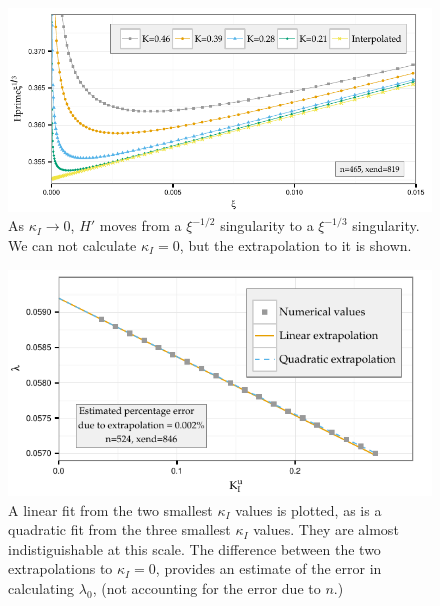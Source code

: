 \documentclass{jfm}
\begin{document}
\begin{figure}
  \centerline{\includegraphics{./../../Graphs/hprime-x.pdf}}
  \caption{As $\kappa_I\to 0$, $H'$ moves from a $\xi^{-1/2}$ singularity
           to a $\xi^{-1/3}$ singularity. We can not calculate $\kappa_I=0$, 
           but the extrapolation to it is shown.}
\end{figure}
\begin{figure}
  \centerline{\includegraphics{./../../Graphs/l0.pdf}}
  \caption{A linear fit from the two smallest $\kappa_I$ values is plotted, 
           as is a quadratic fit from the three smallest $\kappa_I$ values.
           They are almost indistiguishable at this scale. 
           The difference between the two extrapolations to $\kappa_I=0$,  
           provides an estimate of the error in calculating $\lambda_0$, 
           (not accounting for the error due to $n$.) }
\end{figure}
\end{document}
